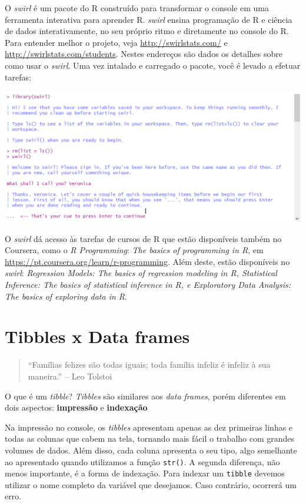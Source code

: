 \documentclass[a4paper]{book}
\begin{document}
O \emph{swirl} é um pacote do R construído para transformar o console em uma ferramenta interativa para aprender R. \emph{swirl} ensina programação de R e ciência de dados interativamente, no seu próprio ritmo e diretamente no console do R. Para entender melhor o projeto, veja \url{http://swirlstats.com/} e \url{http://swirlstats.com/students}. Nestes endereços são dados os detalhes sobre como usar o \emph{swirl}. Uma vez intalado e carregado o pacote, você é levado a efetuar tarefas:

\begin{center}\includegraphics[width=0.9\linewidth]{imagens/swirl} \end{center}

O \emph{swirl} dá acesso às tarefas de cursos de R que estão disponíveis também no Coursera, como o \emph{R Programming}: \emph{The basics of programming in R}, em \url{https://pt.coursera.org/learn/r-programming}. Além deste, estão
disponíveis no \emph{swirl}: \emph{Regression Models: The basics of regression modeling in R, Statistical Inference: The basics of statistical inference in R, e Exploratory Data Analysis: The basics of exploring data in R}.

\hypertarget{literature}{%
\chapter{Tibbles x Data frames}\label{literature}}

\begin{quote}
``Famílias felizes são todas iguais; toda família infeliz é infeliz à sua maneira.'' -- Leo Tolstoi
\end{quote}

O que é um \emph{tibble}? \emph{Tibbles} são similares aos \emph{data frames}, porém diferentes em dois aspectos: \textbf{impressão} e \textbf{indexação}

Na impressão no console, os \emph{tibbles} apresentam apenas as dez primeiras linhas e todas as colunas que cabem na tela, tornando mais fácil o trabalho com grandes volumes de dados. Além disso, cada coluna apresenta o seu tipo, algo semelhante ao apresentado quando utilizamos a função \texttt{str()}. A segunda diferença, não menos importante, é a forma de indexação. Para indexar um \texttt{tibble} devemos utilizar o nome completo da variável que desejamos. Caso contrário, ocorrerá um erro.
\end{document}
